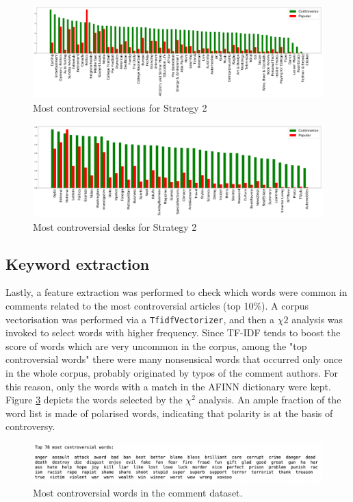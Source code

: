 \begin{figure}[h]
\centering
\includegraphics[width=\tw]{Pictures/Strat2SN.pdf}
\caption{Most controversial sections for Strategy 2}
\label{RG2}
\end{figure}

\begin{figure}[h]
\centering
\includegraphics[width=\tw]{Pictures/Strat2ND.pdf}
\caption{Most controversial desks for Strategy 2}
\label{RG2nd}
\end{figure}


\subsection{Keyword extraction}
Lastly, a feature extraction was performed to check which words were common in comments related to the most controversial articles (top 10\%). A corpus vectorisation was performed via a {\tt TfidfVectorizer}, and then a $\chi2$ analysis was invoked to select words with higher frequency. Since TF-IDF tends to boost the score of words which are very uncommon in the corpus, among the "top controversial words" there were many nonsensical words that occurred only once in the whole corpus, probably originated by typos of the comment authors. For this reason, only the words with a match in the AFINN dictionary were kept. Figure \ref{TopWords} depicts the words selected by the $\chi^2$ analysis. An ample fraction of the word list is made of polarised words, indicating that polarity is at the basis of controversy.

\begin{figure}[h!]
\centering
\includegraphics[width=\linewidth]{Pictures/TopWs.png}
\caption{Most controversial words in the comment dataset.}
\label{TopWords}
\end{figure}

